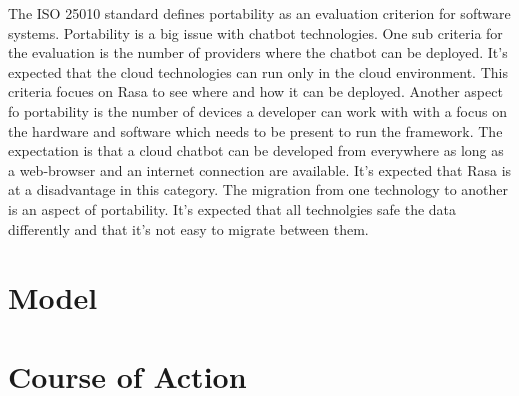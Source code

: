 The ISO 25010\cite{iso25010} standard defines portability as an evaluation criterion for software systems.
Portability is a big issue with chatbot technologies.
One sub criteria for the evaluation is the number of providers where the chatbot 
can be deployed.
It's expected that the cloud technologies can run only in the cloud environment.
This criteria focues on Rasa to see where and how it can be deployed.
Another aspect fo portability is the number of devices a developer can work with 
with a focus on the hardware and software which needs to be present to run the 
framework.
The expectation is that a cloud chatbot can be developed from everywhere 
as long as a web-browser and an internet connection are available.
It's expected that Rasa is at a disadvantage in this category.
The migration from one technology to another is an aspect of portability.
It's expected that all technolgies safe the data differently and that it's not 
easy to migrate between them.


\section{Model}


\section{Course of Action} %
